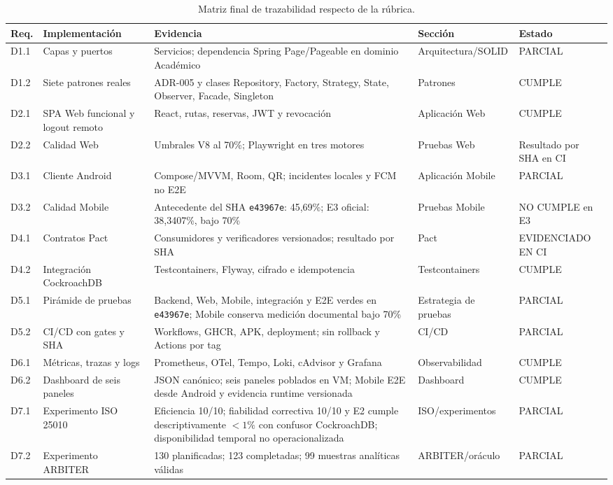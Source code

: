 \begin{table}[ht]
  \centering
  \scriptsize
  \caption{Matriz final de trazabilidad respecto de la rúbrica.}
  \label{tab:trazabilidad-final}
  \begin{tabular}{|p{1.1cm}|p{3.0cm}|p{4.1cm}|p{2.2cm}|p{1.7cm}|}
    \hline
    \textbf{Req.} & \textbf{Implementación} & \textbf{Evidencia} & \textbf{Sección} & \textbf{Estado} \\
    \hline
    D1.1 & Capas y puertos & Servicios; dependencia Spring Page/Pageable en dominio Académico & Arquitectura/SOLID & PARCIAL \\
    \hline
    D1.2 & Siete patrones reales & ADR-005 y clases Repository, Factory, Strategy, State, Observer, Facade, Singleton & Patrones & CUMPLE \\
    \hline
    D2.1 & SPA Web funcional y logout remoto & React, rutas, reservas, JWT y revocación & Aplicación Web & CUMPLE \\
    \hline
    D2.2 & Calidad Web & Umbrales V8 al 70\%; Playwright en tres motores & Pruebas Web & Resultado por SHA en CI \\
    \hline
    D3.1 & Cliente Android & Compose/MVVM, Room, QR; incidentes locales y FCM no E2E & Aplicación Mobile & PARCIAL \\
    \hline
    D3.2 & Calidad Mobile & Antecedente del SHA \texttt{e43967e}: 45,69\%; E3 oficial: 38,3407\%, bajo 70\% & Pruebas Mobile & NO CUMPLE en E3 \\
    \hline
    D4.1 & Contratos Pact & Consumidores y verificadores versionados; resultado por SHA & Pact & EVIDENCIADO EN CI \\
    \hline
    D4.2 & Integración CockroachDB & Testcontainers, Flyway, cifrado e idempotencia & Testcontainers & CUMPLE \\
    \hline
    D5.1 & Pirámide de pruebas & Backend, Web, Mobile, integración y E2E verdes en \texttt{e43967e}; Mobile conserva medición documental bajo 70\% & Estrategia de pruebas & PARCIAL \\
    \hline
    D5.2 & CI/CD con gates y SHA & Workflows, GHCR, APK, deployment; sin rollback y Actions por tag & CI/CD & PARCIAL \\
    \hline
    D6.1 & Métricas, trazas y logs & Prometheus, OTel, Tempo, Loki, cAdvisor y Grafana & Observabilidad & CUMPLE \\
    \hline
    D6.2 & Dashboard de seis paneles & JSON canónico; seis paneles poblados en VM; Mobile E2E desde Android y evidencia runtime versionada & Dashboard & CUMPLE \\
    \hline
    D7.1 & Experimento ISO 25010 & Eficiencia 10/10; fiabilidad correctiva 10/10 y E2 cumple descriptivamente $<1\%$ con confusor CockroachDB; disponibilidad temporal no operacionalizada & ISO/experimentos & PARCIAL \\
    \hline
    D7.2 & Experimento ARBITER & 130 planificadas; 123 completadas; 99 muestras analíticas válidas & ARBITER/oráculo & PARCIAL \\
    \hline
  \end{tabular}
\end{table}

